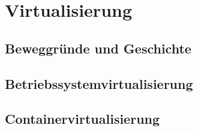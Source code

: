 \chapter{Virtualisierung}
\label{cha:virtualisierung}
\section{Beweggründe und Geschichte}
\section{Betriebssystemvirtualisierung}
\section{Containervirtualisierung}
